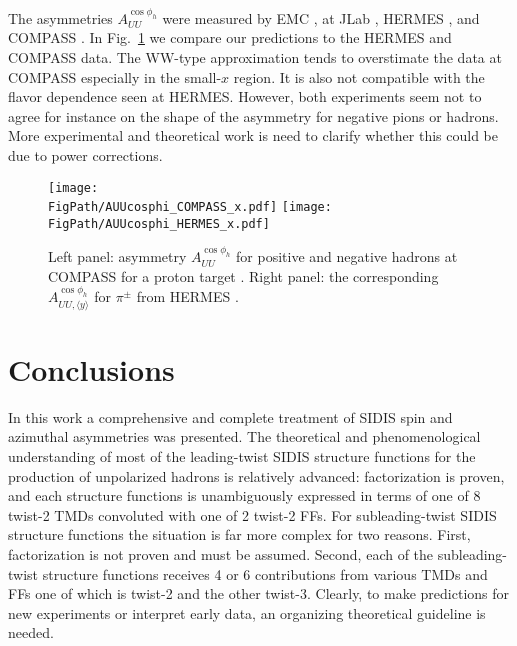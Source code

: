 \documentclass[a4paper,11pt]{article}
\newcommand*{\FigPath}{./figs}%
\begin{document}
The asymmetries $A_{UU}^{\cos\phi_h}$ were measured by
EMC \cite{Aubert:1983cz}, at JLab \cite{Osipenko:2008aa,Mkrtchyan:2007sr},
HERMES \cite{Airapetian:2012yg}, and COMPASS \cite{Adolph:2014pwc}.
In Fig.~\ref{auucosphi_jlab} we compare our predictions to the HERMES and
COMPASS data.
The WW-type approximation tends to overstimate the data at
COMPASS especially in the small-$x$ region. It is also not
compatible with the flavor dependence seen at HERMES.
However, both experiments seem not to agree for instance on the shape
of the asymmetry for negative pions or hadrons. More experimental and
theoretical work is need to clarify whether this could be due to
power corrections.

\begin{figure}[h]
\centering
\texttt{[image: \\FigPath/AUUcosphi\_COMPASS\_x.pdf]}
\texttt{[image: \\FigPath/AUUcosphi\_HERMES\_x.pdf]}
\caption{\label{auucosphi_jlab}
	Left panel: asymmetry $A_{UU}^{\cos\phi_h}$ for positive and negative
	hadrons at COMPASS for a proton target \cite{Adolph:2014pwc}. Right
	panel: the corresponding $A_{UU, \langle y \rangle}^{\cos\phi_h}$ for $\pi^\pm$ from HERMES \cite{Airapetian:2012yg}.}
\end{figure}




\section{Conclusions}
\label{Sec-8:conclusions}

In this work a comprehensive and complete treatment of SIDIS
spin and azimuthal asymmetries was presented.
The theoretical and phenomenological understanding of most of the
leading-twist SIDIS structure functions for the production of
unpolarized hadrons is relatively advanced: factorization is
proven, and each structure functions is unambiguously expressed in
terms of one of 8 twist-2 TMDs convoluted with one of 2 twist-2 FFs.
For subleading-twist SIDIS structure functions the situation
is far more complex for two reasons. First, factorization is not
proven and must be assumed.
Second, each of the subleading-twist structure functions
receives 4 or 6 contributions from various TMDs and FFs one of
which is twist-2 and the other twist-3. Clearly, to make
predictions for new experiments or interpret early data, an
organizing theoretical guideline is needed.
\end{document}
